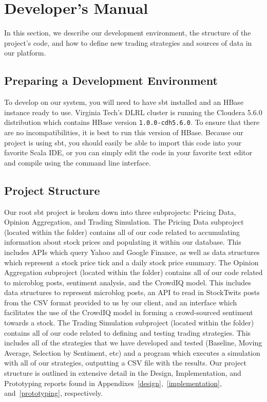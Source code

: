 \section{Developer's Manual}

In this section, we describe our development environment, the structure of the project's code, and how to define new trading strategies and sources of data in our platform.

\subsection{Preparing a Development Environment}

To develop on our system, you will need to have sbt\cite{sbt} installed and an HBase\cite{hbase} instance ready to use. Virginia Tech's DLRL cluster is running the Cloudera 5.6.0 distribution which contains HBase version \texttt{1.0.0-cdh5.6.0}. To ensure that there are no incompatibilities, it is best to run this version of HBase. Because our project is using sbt, you should easily be able to import this code into your favorite Scala IDE, or you can simply edit the code in your favorite text editor and compile using the command line interface.

\subsection{Project Structure}

Our root sbt project is broken down into three subprojects: Pricing Data, Opinion Aggregation, and Trading Simulation.
The Pricing Data subproject (located within the  folder) contains all of our code related to accumulating information about stock prices and populating it within our database.
This includes APIs which query Yahoo and Google Finance, as well as data structures which represent a stock price tick and a daily stock price summary.
The Opinion Aggregation subproject (located within the  folder) contains all of our code related to microblog posts, sentiment analysis, and the CrowdIQ model.
This includes data structures to represent microblog posts, an API to read in StockTwits posts from the CSV format provided to us by our client, and an interface which facilitates the use of the CrowdIQ model in forming a crowd-sourced sentiment towards a stock.
The Trading Simulation subproject (located within the  folder) contains all of our code related to defining and testing trading strategies.
This includes all of the strategies that we have developed and tested (Baseline, Moving Average, Selection by Sentiment, etc) and a program which executes a simulation with all of our strategies, outputting a CSV file with the results.
Our project structure is outlined in extensive detail in the Design, Implementation, and Prototyping reports found in Appendixes~\ref{design},~\ref{implementation}, and~\ref{prototyping}, respectively.

